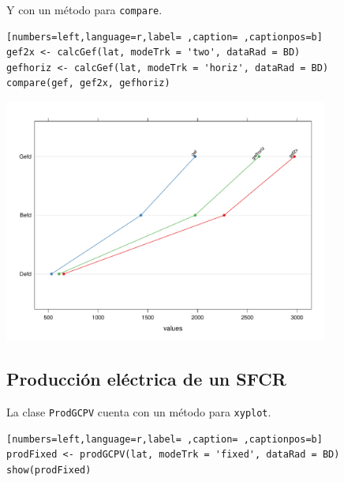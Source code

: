 Y con un método para \texttt{compare}.
\begin{lstlisting}[numbers=left,language=r,label= ,caption= ,captionpos=b]
gef2x <- calcGef(lat, modeTrk = 'two', dataRad = BD)
gefhoriz <- calcGef(lat, modeTrk = 'horiz', dataRad = BD)
compare(gef, gef2x, gefhoriz)
\end{lstlisting}

\begin{center}
\includegraphics[width=0.8\textwidth]{figuras/codigo-gef2.pdf}
\end{center}


\subsection{Producción eléctrica de un SFCR}
\label{sec:org59af46e}
La clase \texttt{ProdGCPV} cuenta con un método para \texttt{xyplot}.
\begin{lstlisting}[numbers=left,language=r,label= ,caption= ,captionpos=b]
prodFixed <- prodGCPV(lat, modeTrk = 'fixed', dataRad = BD)
show(prodFixed)
\end{lstlisting}

